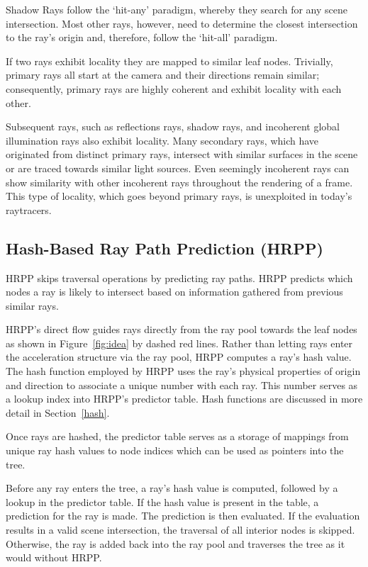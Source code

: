 Shadow Rays follow the `hit-any' paradigm, whereby they search for any scene intersection. Most other rays, however, need to determine the closest intersection to the ray's origin and, therefore, follow the `hit-all' paradigm. 

If two rays exhibit locality they are mapped to similar leaf nodes. Trivially, primary rays all start at the camera and their directions remain similar; consequently, primary rays are highly coherent and exhibit locality with each other. 

Subsequent rays, such as reflections rays, shadow rays, and incoherent global illumination rays also exhibit locality. Many secondary rays, which have originated from distinct primary rays, intersect with similar surfaces in the scene or are traced towards similar light sources. Even seemingly incoherent rays can show similarity with other incoherent rays throughout the rendering of a frame. This type of locality, which goes beyond primary rays, is unexploited in today's raytracers.


\subsection{Hash-Based Ray Path Prediction (HRPP)}
HRPP skips traversal operations by predicting ray paths. HRPP predicts which nodes a ray is likely to intersect based on information gathered from previous similar rays.

HRPP's direct flow guides rays directly from the ray pool towards the leaf nodes as shown in Figure~\ref{fig:idea} by dashed red lines. Rather than letting rays enter the acceleration structure via the ray pool, HRPP computes a ray's hash value. The hash function employed by HRPP uses the ray's physical properties of origin and direction to associate a unique number with each ray. This number serves as a lookup index into HRPP's predictor table. Hash functions are discussed in more detail in Section~\ref{hash}.

Once rays are hashed, the predictor table serves as a storage of mappings from unique ray hash values to node indices which can be used as pointers into the tree. 

Before any ray enters the tree, a ray's hash value is computed, followed by a lookup in the predictor table. If the hash value is present in the table, a prediction for the ray is made. The prediction is then evaluated. If the evaluation results in a valid scene intersection, the traversal of all interior nodes is skipped. Otherwise, the ray is added back into the ray pool and traverses the tree as it would without HRPP.

